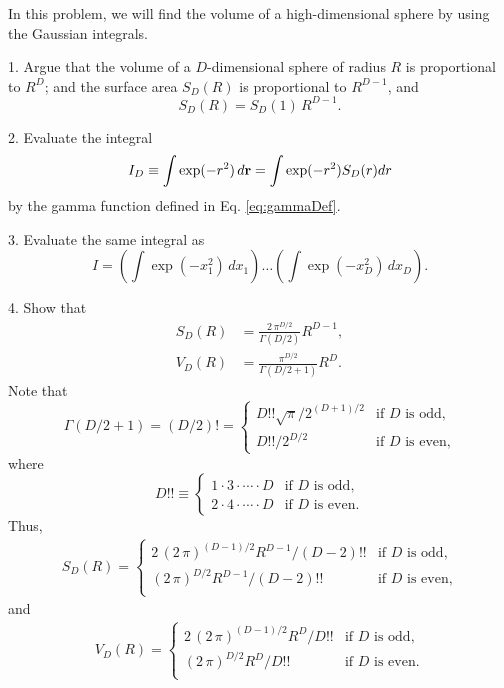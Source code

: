 \documentclass{book}
\begin{document}



In this problem, we will find the volume of a high-dimensional sphere
by using the Gaussian integrals.

1. Argue that the volume of a $D$-dimensional sphere of radius $R$ is proportional to
$R^D$; and the surface area $S_D(R)$ is proportional to $R^{D-1}$, and
\[
  S_D(R) = S_D(1) \, R^{D-1}.
\]

2. Evaluate the integral
\[
  I_D \equiv \int \exp(-r^2) \, d\boldsymbol{\mathbf{r}} = \int \exp(-r^2) S_D(r) dr
\]
by the gamma function defined in Eq. \eqref{eq:gammaDef}.

3. Evaluate the same integral as
\[
  I
  =
\left( \int \exp(-x_1^2) \, d x_1 \right)
\dots
\left( \int \exp(-x_D^2) \, d x_D \right).
\]

4. Show that
\begin{align}
  S_D(R) &= \frac{ 2 \, \pi^{D/2} } { \Gamma(D/2) } R^{D-1},
  \label{eq:SD} \\
  V_D(R) &= \frac { \pi^{D/2} } { \Gamma(D/2+1) } R^D.
  \label{eq:VD}
\end{align}
Note that
\begin{equation}
  \Gamma\left( D/2 + 1 \right)
= \left( D/2 \right)!
=
\begin{cases}
  D!! \sqrt{\pi} / 2^{(D+1)/2}  & \mbox{if $D$ is odd,} \\
  D!! / 2^{D/2}                 & \mbox{if $D$ is even,}
\end{cases}
\label{eq:doublefactorial}
\end{equation}
where
\begin{equation}
  D!!
\equiv
\begin{cases}
  1 \cdot 3 \cdot \cdots \cdot D  & \mbox{if $D$ is odd,} \\
  2 \cdot 4 \cdot \cdots \cdot D  & \mbox{if $D$ is even.}
\end{cases}
\end{equation}
%
Thus,
\begin{align}
  S_D(R)
=
\begin{cases}
  2 \, (2 \, \pi)^{(D-1)/2} R^{D-1} / (D-2)!!  & \mbox{if $D$ is odd,} \\
       (2 \, \pi)^{D/2} R^{D-1} / (D-2)!!      & \mbox{if $D$ is even,} \\
\end{cases}
\label{eq:SDoe}
\end{align}
and
\begin{align}
  V_D(R)
=
\begin{cases}
  2 \, (2 \, \pi)^{(D-1)/2} R^D / D!!  & \mbox{if $D$ is odd,} \\
       (2 \, \pi)^{D/2} R^D / D!!      & \mbox{if $D$ is even.} \\
\end{cases}
\label{eq:VDoe}
\end{align}
\end{document}
